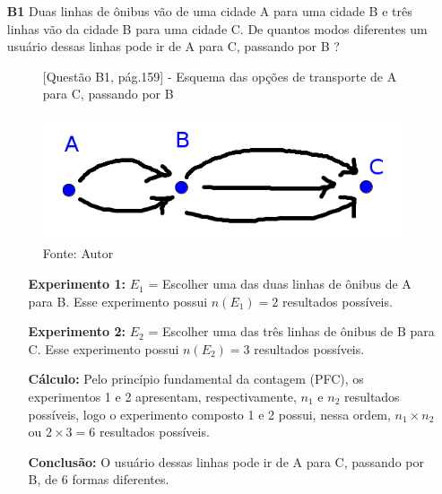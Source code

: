 \documentclass[a4paper,12pt]{article}
\begin{document}
\begin{enumerate}

\item[\textbf{B1}] Duas linhas de ônibus vão de uma cidade A para uma cidade B e três linhas vão da cidade B para uma cidade C. De quantos modos diferentes um usuário dessas linhas pode ir de A para C, passando por B ?

    \begin{figure}[htb]
      \centering
      \caption{[Questão B1, pág.159] - Esquema das opções de transporte de A para C, passando por B}
      \includegraphics[scale=0.6]{../../imagens/geogebra-cap21-exercicios-B1-pag159.png}
      \caption*{Fonte: Autor}
      \label{geogebra-cap21-exercicios-B1-pag159}
    \end{figure}

   \begin{itemize}
     \item[\ding{172}] \textbf{Experimento 1:} $E_1$ = Escolher uma das duas linhas de ônibus de A para B. Esse experimento possui $n(E_1) = 2$ resultados possíveis.
     \item[\ding{173}] \textbf{Experimento 2:} $E_2$ = Escolher uma das três linhas de ônibus de B para C. Esse experimento possui $n(E_2) = 3$ resultados possíveis.
     \item[\ding{174}] \textbf{Cálculo:} Pelo princípio fundamental da contagem (PFC), os experimentos 1 e 2 apresentam, respectivamente, $n_{1} \textrm{ e } n_{2}$ resultados possíveis, logo o experimento composto 1 e 2 possui, nessa ordem, $n_{1} \times n_{2}$ ou $2 \times 3 = 6$ resultados possíveis.
     \item[\ding{175}] \textbf{Conclusão:} O usuário dessas linhas pode ir de A para C, passando por B, de 6 formas diferentes.   \end{itemize}
  

\end{enumerate}
\end{document}
